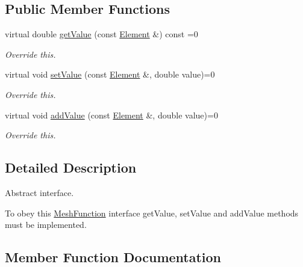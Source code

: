 \subsection*{Public Member Functions}
\begin{DoxyCompactItemize}
\item 
virtual double \hyperlink{classraytracer_1_1geometry_1_1MeshFunction_a8e8a42e0d1793e48146ac7aaf98026c4}{get\+Value} (const \hyperlink{classraytracer_1_1geometry_1_1Element}{Element} \&) const =0
\begin{DoxyCompactList}\small\item\em Override this. \end{DoxyCompactList}\item 
virtual void \hyperlink{classraytracer_1_1geometry_1_1MeshFunction_a9e677af2a48d1b372b19fd6462612744}{set\+Value} (const \hyperlink{classraytracer_1_1geometry_1_1Element}{Element} \&, double value)=0
\begin{DoxyCompactList}\small\item\em Override this. \end{DoxyCompactList}\item 
virtual void \hyperlink{classraytracer_1_1geometry_1_1MeshFunction_a5a5908cb7ce59486d3fe987f73d040b6}{add\+Value} (const \hyperlink{classraytracer_1_1geometry_1_1Element}{Element} \&, double value)=0
\begin{DoxyCompactList}\small\item\em Override this. \end{DoxyCompactList}\end{DoxyCompactItemize}


\subsection{Detailed Description}
Abstract interface. 

To obey this \hyperlink{classraytracer_1_1geometry_1_1MeshFunction}{Mesh\+Function} interface get\+Value, set\+Value and add\+Value methods must be implemented. 

\subsection{Member Function Documentation}
\mbox{\label{classraytracer_1_1geometry_1_1MeshFunction_a5a5908cb7ce59486d3fe987f73d040b6}} 

